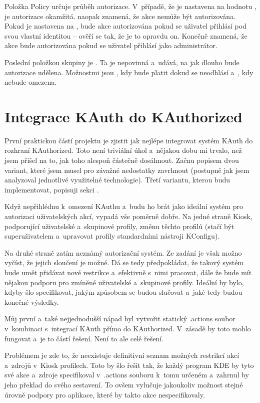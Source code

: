 Položka Policy určuje průběh autorizace. V~případě, že je nastavena na hodnotu , je autorizace okamžitá.  naopak znamená, že akce nemůže být autorizována. Pokud je nastavena na , bude akce autorizována pokud se uživatel přihlásí pod svou vlastní identitou -- ověří se tak, že je to opravdu on. Konečně  znamená, že akce bude autorizována pokud se uživatel přihlásí jako administrátor.

Poslední položkou skupiny je . Ta je nepovinná a~udává, na jak dlouho bude autorizace udělena. Možnostmi jsou , kdy bude platit dokud se neodhlásí a~, kdy nebude omezena.

\chapter{Integrace KAuth do KAuthorized}
První praktickou částí projektu je zjistit jak nejlépe integrovat systém KAuth do rozhraní KAuthorized. Toto není triviální úkol a~nějakou dobu mi trvalo, než jsem přišel na to, jak toho alespoň částečně dosáhnout. Začnu popisem dvou variant, které jsem musel pro závažné nedostatky zavrhnout (postupně jak jsem analyzoval jednotlivé  využitelné technologie). Třetí variantu, kterou budu implementovat, popisuji sekci .

Když nepřihlédnu k~omezení KAuthu a~budu ho brát jako ideální systém pro autorizaci uživatelských akcí, vypadá vše poměrně dobře. Na jedné straně Kiosk, podporující uživatelské a~skupinové profily, změnu těchto profilů (stačí být superuživatelem a~upravovat profily standardními nástroji KConfigu).

Na druhé straně zatím neznámý autorizační systém. Ze zadání je však možno vyčíst, že jejich sloučení je možné. Dá se tedy předpokládat, že takový systém bude umět přidávat nové restrikce a~efektivně s~nimi pracovat, dále že bude mít nějakou podporu pro zmíněné uživatelské a~skupinové profily. Ideální by bylo, kdyby šlo specifikovat, jakým způsobem se budou slučovat a~jaké tedy budou konečné výsledky.

Můj první a~také nejjednodušší nápad byl vytvořit statický .actions soubor v~kombinaci s~integrací KAuth přímo do KAuthorized. V~zásadě by toto mohlo fungovat a~je to částí řešení. Není to ale celé řešení.

Problémem je zde to, že neexistuje definitivní seznam možných restrikcí akcí a~zdrojů v~Kiosk profilech. Toto by šlo řešit tak, že každý program KDE by tyto své akce a~zdroje specifikoval v~.actions souboru k~tomu určeném a~zahrnul by jeho překlad do svého sestavení. To ovšem vylučuje jakoukoliv možnost stejné úrovně podpory pro aplikace, které by takto akce nespecifikovaly.

